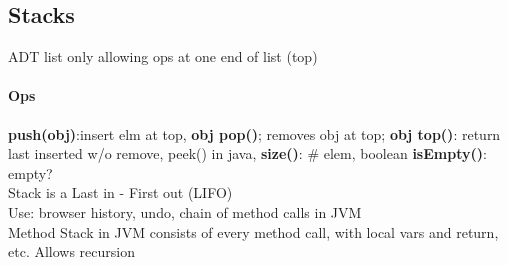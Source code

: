 \subsection{Stacks} ADT list only allowing ops at one end of list (top) 
\vspace{-7 pt}
\paragraph{Ops} \textbf{push(obj)}:insert elm at top, \textbf{obj pop()}; removes obj at top; \textbf{obj top()}: return last inserted w/o remove, peek() in java, \textbf{size()}: \# elem, boolean \textbf{isEmpty()}: empty?
\\ Stack is a Last in - First out (LIFO)
\\ Use: browser history, undo, chain of method calls in JVM
\\ Method Stack in JVM consists of every method call, with local vars and return, etc. Allows recursion
\vspace{-7 pt}
